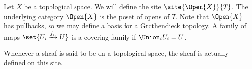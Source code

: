 \begin{definition}
Let $X$ be a topological space.
We will define the site $\site{\Open{X}}{T}$.
The underlying category $\Open{X}$ is the poset of opens of $T$.
Note that $\Open{X}$ has pullbacks, so we may define a basis for a Grothendieck topology.
A family of maps $\set{U_i \xrightarrow{f_i} U}$ is a covering family if $\Union_i U_i = U$.

Whenever a sheaf is said to be on a topological space, the sheaf is actually defined on this site.
\end{definition}